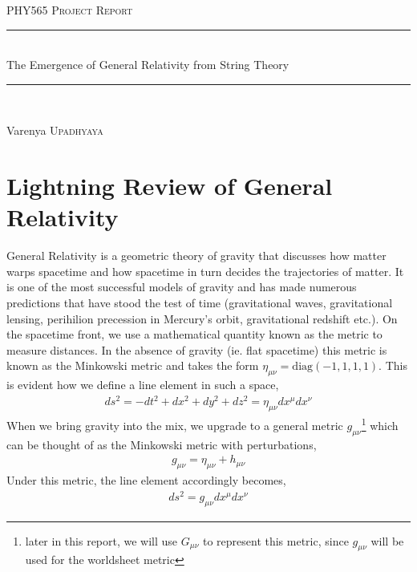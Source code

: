 \documentclass{article}
\newcommand{\HRule}{\rule{\linewidth}{0.3mm}} %
\begin{document}

\begin{center}
\textsc{\Large PHY565 Project Report}\\[0.3cm] %
\HRule \\[0.4cm]
    { \huge The Emergence of General Relativity from String Theory\\}
\HRule \\
\begin{flushright}
    Varenya \textsc{Upadhyaya}\\[1cm] 
\end{flushright}
\end{center} 

\section{Lightning Review of General Relativity}
General Relativity is a geometric theory of gravity that discusses how matter warps spacetime and how spacetime in turn decides the trajectories of matter. It is one of the most successful models of gravity and has made numerous predictions that have stood the test of time (gravitational waves, gravitational lensing, perihilion precession in Mercury's orbit, gravitational redshift etc.). On the spacetime front, we use a mathematical quantity known as the metric to measure distances. In the absence of gravity (ie. flat spacetime) this metric is known as the Minkowski metric and takes the form $\eta_{\mu\nu}=\text{diag}(-1,1,1,1)$. This is evident how we define a line element in such a space,
\begin{align}
    ds^2 = -dt^2+dx^2+dy^2+dz^2 = \eta_{\mu\nu}dx^\mu dx^\nu
\end{align}
When we bring gravity into the mix, we upgrade to a general metric $g_{\mu\nu}$\footnote{later in this report, we will use $G_{\mu\nu}$ to represent this metric, since $g_{\mu\nu}$ will be used for the worldsheet metric} which can be thought of as the Minkowski metric with perturbations,
\begin{align}
    g_{\mu\nu}=\eta_{\mu\nu}+h_{\mu\nu}
\end{align}
Under this metric, the line element accordingly becomes,
\begin{align}
    ds^2 = g_{\mu\nu}dx^\mu dx^\nu
\end{align}
\end{document}
